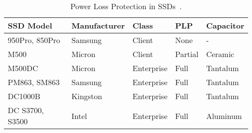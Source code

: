 \begin{table}[b]
    \centering
        \caption{Power Loss Protection in SSDs~\cite{micron2014, intel2014, samsungplp2016}.}
    \label{ssd_plp}
    \fontsize{11}{11}
    \small
    \begin{tabular}{|l|l|l|l|l|}
        \hline
        \footnotesize{\bf{SSD Model}} &
        \footnotesize{\bf{Manufacturer}} & 
        \footnotesize{\bf{Class}} &
        \footnotesize{\bf{PLP}} & 
        \footnotesize{\bf{Capacitor}} \\ \hline \hline

        \footnotesize{950Pro, 850Pro} & \footnotesize{Samsung} & \footnotesize{Client} & \footnotesize{None} & - \\ \hline
        \footnotesize{M500} & \footnotesize{Micron} & \footnotesize{Client} & \footnotesize{Partial} & \footnotesize{Ceramic} \\ \hline
        \footnotesize{M500DC} & \footnotesize{Micron} & \footnotesize{Enterprise} & \footnotesize{Full} & \footnotesize{Tantalum} \\ \hline
        \footnotesize{PM863, SM863} & \footnotesize{Samsung} & \footnotesize{Enterprise} & \footnotesize{Full} & \footnotesize{Tantalum} \\ \hline
        \footnotesize{DC1000B} & \footnotesize{Kingston} & \footnotesize{Enterprise} & \footnotesize{Full} & \footnotesize{Tantalum} \\ \hline
        \footnotesize{DC S3700, S3500} & \footnotesize{Intel} & \footnotesize{Enterprise} & \footnotesize{Full} & \footnotesize{Aluminum} \\ \hline
    \end{tabular}

    \vspace{-20pt}  
\end{table}
\iffalse
\textcolor{red}{
As opposed to a memory pressure, the negative impact of data loss is equally serious for both data. Because an SSD writes the associated LPN (Logical Page Number) in the OOB (Out-of-band) area of the physical page, it is virtually possible to recover the up-to-date mapping table by scanning the entire NAND flash memory. However, because it takes prohibitively long, particularly for the scalable SSDs, PLP-SSD snapshots an entire mapping table into the specific area in NAND flash in a power loss and loads it into DRAM at a reboot. The user data also offers no alternative but for PLP as it cannot be recovered after a crash. For the PLP-SSD, the host system ensures reliability assuming that all acknowledged data survive a power outage, and thus, the loss of user data can lead to a catastrophic result.
}
\fi

